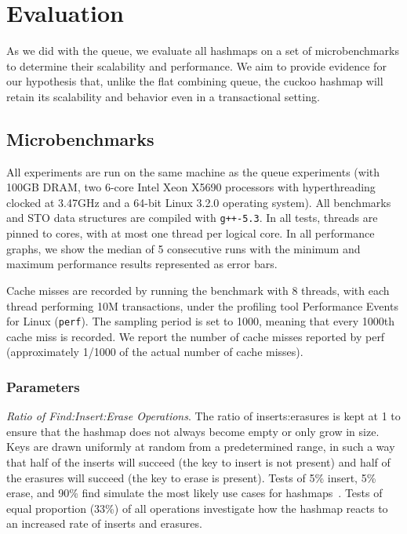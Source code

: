 \section{Evaluation}
\label{hm_eval}

As we did with the queue, we evaluate all hashmaps on a set of microbenchmarks to determine their scalability and performance. We aim to provide evidence for our hypothesis that, unlike the flat combining queue, the cuckoo hashmap will retain its scalability and behavior even in a transactional setting.

\subsection{Microbenchmarks}
All experiments are run on the same machine as the queue experiments (with 100GB DRAM, two 6-core Intel Xeon X5690 processors with hyperthreading clocked at 3.47GHz and a 64-bit Linux 3.2.0 operating system). All benchmarks and STO data structures are compiled with \texttt{g++-5.3}. 
In all tests, threads are pinned to cores, with at most one thread per logical core.
In all performance graphs, we show the median of 5 consecutive runs with the minimum and maximum performance results represented as error bars.

Cache misses are recorded by running the benchmark with 8 threads, with each thread performing 10M transactions, under the profiling tool Performance Events for Linux (\texttt{perf}). The sampling period is set to 1000, meaning that every 1000th cache miss is recorded.
We report the number of cache misses reported by perf (approximately 1/1000 of the actual number of cache misses).

\subsubsection{Parameters}

    \emph{Ratio of Find:Insert:Erase Operations}. The ratio of inserts:erasures is kept at 1 to ensure that the hashmap does not always become empty or only grow in size. Keys are drawn uniformly at random from a predetermined range, in such a way that half of the inserts will succeed (the key to insert is not present) and half of the erasures will succeed (the key to erase is present). Tests of 5\% insert, 5\% erase, and 90\% find simulate the most likely use cases for hashmaps~\cite{hm1}. Tests of equal proportion (33\%) of all operations investigate how the hashmap reacts to an increased rate of inserts and erasures.

